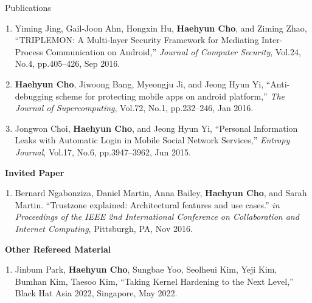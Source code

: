\documentclass{resume} %
\begin{document}
\begin{rSection}{\faGenderless~Publications}
\begin{enumerate}[leftmargin=0pt]
		\item Yiming Jing, Gail-Joon Ahn, Hongxin Hu, \textbf{Haehyun Cho}, and Ziming Zhao,
		``TRIPLEMON: A Multi-layer Security Framework for Mediating Inter-Process Communication on Android,'' 
		\emph{Journal of Computer Security}, 
		Vol.24, No.4, pp.405--426, Sep 2016.

		\item \textbf{Haehyun Cho}, Jiwoong Bang, Myeongju Ji, and Jeong Hyun Yi, 
		``Anti-debugging scheme for protecting mobile apps on android platform,'' 
		\emph{The Journal of Supercomputing}, 
		Vol.72, No.1, pp.232--246, Jan 2016.

		\item Jongwon Choi, \textbf{Haehyun Cho}, and Jeong Hyun Yi, 
		``Personal Information Leaks with Automatic Login in Mobile Social Network Services,'' 
		\emph{Entropy Journal}, 
		Vol.17, No.6, pp.3947--3962, Jun 2015.
	\end{enumerate}
    \vspace{3mm}

   
    \strut\textbullet~{\bf Invited Paper}
    \begin{enumerate}[leftmargin=0pt]
        \item Bernard Ngabonziza, Daniel Martin, Anna Bailey, \textbf{Haehyun Cho}, and Sarah Martin.
        ``Trustzone explained: Architectural features and use cases.''
        \emph{in Proceedings of the IEEE 2nd International Conference on Collaboration and Internet Computing}, 
        Pittsburgh, PA, Nov 2016.    
    \end{enumerate}
	\vspace{3mm}


	\strut\textbullet~{\bf Other Refereed Material}
	\begin{enumerate}[leftmargin=0pt]
		\item Jinbum Park, \textbf{Haehyun Cho}, Sungbae Yoo, Seolheui Kim, Yeji Kim, Bumhan Kim, Taesoo Kim,
		``Taking Kernel Hardening to the Next Level,''
		Black Hat Asia 2022, Singapore, May 2022.
	\end{enumerate}
	
	\vspace{3mm}
\end{rSection}


	
\end{document}
